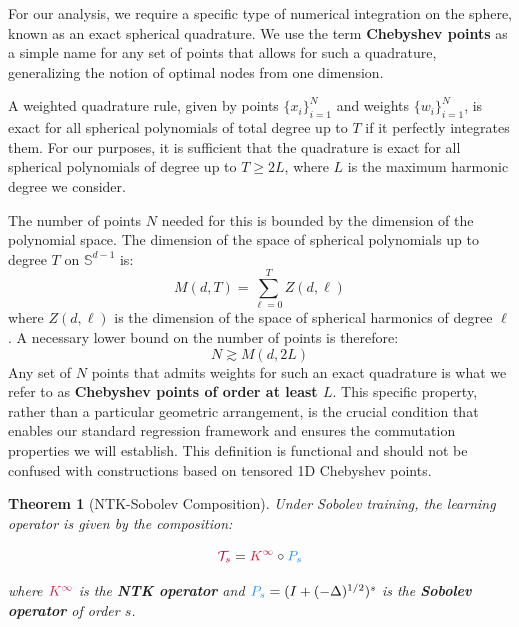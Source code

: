 \documentclass[a4paper]{article}
\newcommand{\Kinf}{\textcolor{kernelcolor}{K^{\infty}}}
\newcommand{\Ps}{\textcolor{sobolevcolor}{P_s}}
\newcommand{\Ts}{\textcolor{purple}{\mathcal{T}_s}}
\theoremstyle{plain}
\newtheorem{theorem}{Theorem}[section]
\theoremstyle{definition}
\theoremstyle{remark}
\newcommand{\Kinf}{\textcolor{kernelcolor}{K^{\infty}}}
\newcommand{\Ps}{\textcolor{sobolevcolor}{P_s}}
\newcommand{\Ts}{\mathcal{T}_s}
\begin{document}
\begin{tcolorbox}[colback=yellow!10,colframe=orange!60!black,title={\textbf{Definition: Chebyshev points and Exact Spherical Quadrature}},enhanced,drop shadow]
    For our analysis, we require a specific type of numerical integration on the sphere, known as an exact spherical quadrature. We use the term \textbf{Chebyshev points} as a simple name for any set of points that allows for such a quadrature, generalizing the notion of optimal nodes from one dimension.

    A weighted quadrature rule, given by points $\{x_i\}_{i=1}^N$ and weights $\{w_i\}_{i=1}^N$, is exact for all spherical polynomials of total degree up to $T$ if it perfectly integrates them. For our purposes, it is sufficient that the quadrature is exact for all spherical polynomials of degree up to $T \ge 2L$, where $L$ is the maximum harmonic degree we consider.

    The number of points $N$ needed for this is bounded by the dimension of the polynomial space. The dimension of the space of spherical polynomials up to degree $T$ on $\mathbb{S}^{d-1}$ is:
    \[
        M(d, T) = \sum_{\ell=0}^{T} Z(d, \ell)
    \]
    where $Z(d, \ell)$ is the dimension of the space of spherical harmonics of degree $\ell$. A necessary lower bound on the number of points is therefore:
    \begin{equation}
        \label{eq:quadrature_point_bound}
        N \gtrsim M(d, 2L)
    \end{equation}
    Any set of $N$ points that admits weights for such an exact quadrature is what we refer to as \textbf{Chebyshev points of order at least $L$}. This specific property, rather than a particular geometric arrangement, is the crucial condition that enables our standard regression framework and ensures the commutation properties we will establish. This definition is functional and should not be confused with constructions based on tensored 1D Chebyshev points.
\end{tcolorbox}

\begin{theorem}[NTK-Sobolev Composition]
\label{thm:ntk_sobolev_composition}
Under \textit{Sobolev training}, the learning operator is given by the composition:
\begin{tcolorbox}[colback=purple!5,colframe=purple!60!black,title=Learning Operator Composition]
\begin{equation}
\label{eq:learning_operator}
\Ts = \Kinf \circ \Ps
\end{equation}
\end{tcolorbox}
where $\Kinf$ is the \textcolor{kernelcolor}{\textbf{NTK operator}} and $\Ps = (I + (-\Delta)^{1/2})^s$ is the \textcolor{sobolevcolor}{\textbf{Sobolev operator}} of order $s$.
\end{theorem}
\end{document}

